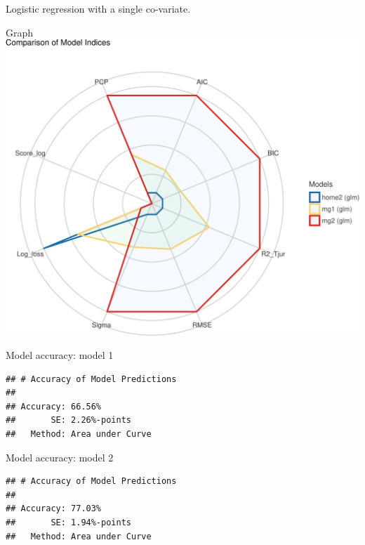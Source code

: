 \documentclass[
  ignorenonframetext,
]{beamer}
\begin{document}
\begin{frame}[fragile]{Logistic regression with a single co-variate.}
\begin{block}{Graph}
\protect\hypertarget{graph-1}{}
\includegraphics{slides_files/figure-beamer/unnamed-chunk-29-1.pdf}
\end{block}

\begin{block}{Model accuracy: model 1}
\protect\hypertarget{model-accuracy-model-1}{}
\begin{verbatim}
## # Accuracy of Model Predictions
## 
## Accuracy: 66.56%
##       SE: 2.26%-points
##   Method: Area under Curve
\end{verbatim}
\end{block}

\begin{block}{Model accuracy: model 2}
\protect\hypertarget{model-accuracy-model-2}{}
\begin{verbatim}
## # Accuracy of Model Predictions
## 
## Accuracy: 77.03%
##       SE: 1.94%-points
##   Method: Area under Curve
\end{verbatim}
\end{block}
\end{frame}
\end{document}
